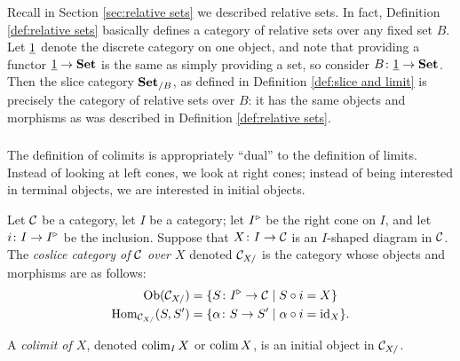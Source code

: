 \begin{remark}

Recall in Section \ref{sec:relative sets} we described relative sets. In fact, Definition \ref{def:relative sets} basically defines a category of relative sets over any fixed set $B$. Let $\underline{1}$ denote the discrete category on one object, and note that providing a functor $\underline{1}\rightarrow{\bf Set}$ is the same as simply providing a set, so consider $B\colon\underline{1}\rightarrow{\bf Set}$. Then the slice category ${\bf Set}_{/B}$, as defined in Definition \ref{def:slice and limit} is precisely the category of relative sets over $B$: it has the same objects and morphisms as was described in Definition \ref{def:relative sets}.

\end{remark}


\subsubsection{}

The definition of colimits is appropriately “dual” to the definition of limits. Instead of looking at left cones, we look at right cones; instead of being interested in terminal objects, we are interested in initial objects.

\begin{definition}\label{def:coslice and colimit}

Let $\mathcal{C}$ be a category, let $I$ be a category; let $I^\triangleright$ be the right cone on $I$, and let $i\colon I\rightarrow I^\triangleright$ be the inclusion. Suppose that $X\colon I\rightarrow\mathcal{C}$ is an $I$-shaped diagram in $\mathcal{C}$. The {\em coslice category of $\mathcal{C}$ over $X$} denoted $\mathcal{C}_{X/}$ is the category whose objects and morphisms are as follows:
\begin{align*}
\textnormal{Ob}(\mathcal{C}_{X/})&=\{S\colon I^\triangleright\rightarrow\mathcal{C}{\;|\;}S\circ i=X\}\\
\textnormal{Hom}_{\mathcal{C}_{X/}}(S,S')&=\{\alpha\colon S\rightarrow S'{\;|\;}\alpha\circ i=\textnormal{id}_X\}.
\end{align*}

A {\em colimit of $X$}, denoted $\mathop{\textnormal{colim}}_IX$ or $\mathop{\textnormal{colim}} X$, is an initial object in $\mathcal{C}_{X/}$.

\end{definition}

